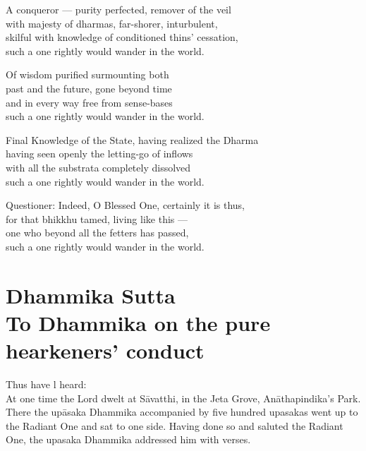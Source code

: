 \begin{MyDescription}{}
A conqueror — purity perfected, remover of the veil\\
with majesty of dharmas, far-shorer, inturbulent,\\
skilful with knowledge of conditioned thins' cessation,\\
such a one rightly would wander in the world.
\end{MyDescription}

\begin{MyDescription}{}
Of wisdom purified surmounting both\\
past and the future, gone beyond time\\
and in every way free from sense-bases\\
such a one rightly would wander in the world.
\end{MyDescription}

\begin{MyDescription}{}
Final Knowledge of the State, having realized the Dharma\\
having seen openly the letting-go of inﬂows\\
with all the substrata completely dissolved\\
such a one rightly would wander in the world.
\end{MyDescription}

\begin{MyDescription}{Questioner:}
Indeed, O Blessed One, certainly it is thus,\\
for that bhikkhu tamed, living like this —\\
one who beyond all the fetters has passed,\\
such a one rightly would wander in the world.
\end{MyDescription}

\begin{MyDescription}[(Sn. 359-375)]{}
\end{MyDescription}

\chapter{Dhammika Sutta\\  To Dhammika on the pure hearkeners' conduct}
Thus have l heard:\\
\newline
At one time the Lord dwelt at S\=avatthi, in the Jeta Grove, An\=athapindika's Park. There the up\=asaka Dhammika accompanied by ﬁve hundred upasakas went up to the Radiant One and sat to one side. Having done so and saluted the Radiant One, the upasaka Dhammika addressed him with verses.


